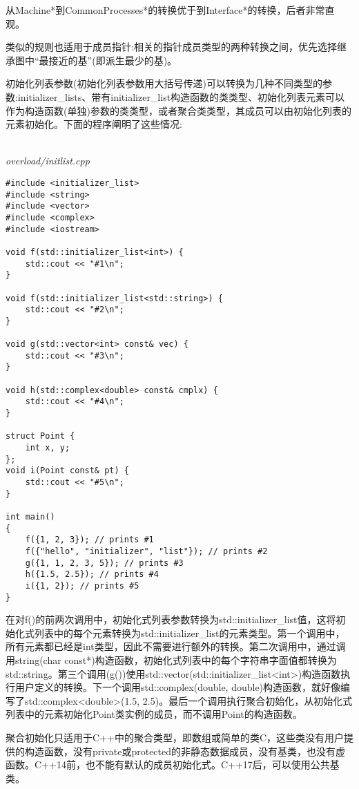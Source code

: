 从Machine*到CommonProcesses*的转换优于到Interface*的转换，后者非常直观。

类似的规则也适用于成员指针:相关的指针成员类型的两种转换之间，优先选择继承图中“最接近的基”(即派生最少的基)。


初始化列表参数(初始化列表参数用大括号传递)可以转换为几种不同类型的参数:initializer\_lists、带有initializer\_list构造函数的类类型、初始化列表元素可以作为构造函数(单独)参数的类类型，或者聚合类类型，其成员可以由初始化列表的元素初始化。下面的程序阐明了这些情况:

\hspace*{\fill} \\ %
\noindent
\textit{overload/initlist.cpp}
\begin{lstlisting}[style=styleCXX]
#include <initializer_list>
#include <string>
#include <vector>
#include <complex>
#include <iostream>

void f(std::initializer_list<int>) {
	std::cout << "#1\n";
}

void f(std::initializer_list<std::string>) {
	std::cout << "#2\n";
}

void g(std::vector<int> const& vec) {
	std::cout << "#3\n";
}

void h(std::complex<double> const& cmplx) {
	std::cout << "#4\n";
}

struct Point {
	int x, y;
};
void i(Point const& pt) {
	std::cout << "#5\n";
}

int main()
{
	f({1, 2, 3}); // prints #1
	f({"hello", "initializer", "list"}); // prints #2
	g({1, 1, 2, 3, 5}); // prints #3
	h({1.5, 2.5}); // prints #4
	i({1, 2}); // prints #5
}	
\end{lstlisting}

在对f()的前两次调用中，初始化式列表参数转换为std::initializer\_list值，这将初始化式列表中的每个元素转换为std::initializer\_list的元素类型。第一个调用中，所有元素都已经是int类型，因此不需要进行额外的转换。第二次调用中，通过调用string(char const*)构造函数，初始化式列表中的每个字符串字面值都转换为std::string。第三个调用(g())使用std::vector(std::initializer\_list<int>)构造函数执行用户定义的转换。下一个调用std::complex(double, double)构造函数，就好像编写了std::complex<double>(1.5, 2.5)。最后一个调用执行聚合初始化，从初始化式列表中的元素初始化Point类实例的成员，而不调用Point的构造函数。

\begin{tcolorbox}[colback=webgreen!5!white,colframe=webgreen!75!black]
\hspace*{0.75cm}聚合初始化只适用于C++中的聚合类型，即数组或简单的类C，这些类没有用户提供的构造函数，没有private或protected的非静态数据成员，没有基类，也没有虚函数。C++14前，也不能有默认的成员初始化式。C++17后，可以使用公共基类。
\end{tcolorbox}

